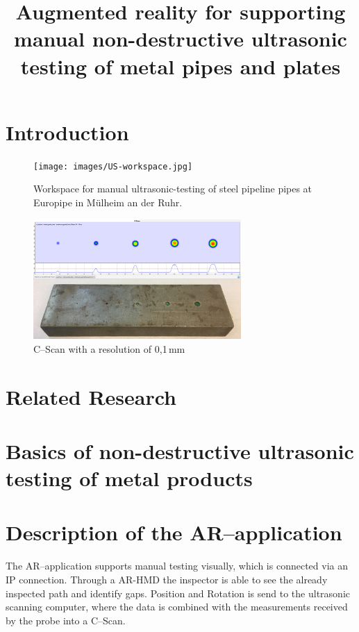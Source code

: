 \documentclass{VRARWorkshop}
\title{Augmented reality for supporting manual non-destructive ultrasonic testing of metal pipes and plates}
\begin{document}
\section{Introduction}

\begin{figure}[h!]
    \begin{center}
        \texttt{[image: images/US-workspace.jpg]}
        \caption{\label{fig:europipe} Workspace for manual ultrasonic-testing of steel pipeline pipes at Europipe in Mülheim an der Ruhr.}
    \end{center}
\end{figure}

\begin{figure}[h!]
    \begin{center}
        \includegraphics[width=79mm]{images/CScan.jpg}
        \caption{\label{fig:cScan} C--Scan with a resolution of 0,1\,mm}
    \end{center}
\end{figure}

\section{Related Research}
\cite{ARPat15}
\cite{ARClean}
\cite{schwerdtfeger_using_2008}
\cite{fadzil_design_2015}
\cite{walter_non-contact_2007}

\section{Basics of non-destructive ultrasonic testing of metal products}
\cite{deutsch_zfp_2010}
\cite{moles_introduction_2004}
\cite{olympus_Grundlagen}

\section{Description of the AR--application}
The AR--application supports manual testing visually, which is connected via an IP connection.
Through a AR-HMD the inspector is able to see the already inspected path and identify gaps.
Position and Rotation is send to the ultrasonic scanning computer, where the data is combined with the measurements received by the probe into a C--Scan.
\end{document}
